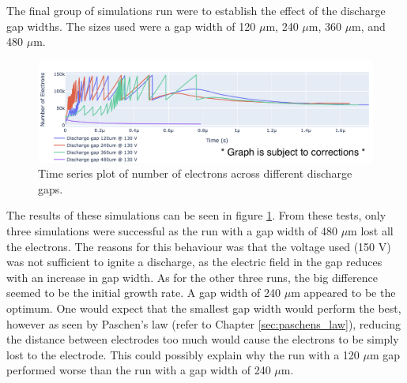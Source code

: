 The final group of simulations run were to establish the effect of the discharge gap widths. The sizes used were a gap width of 120 $\mu$m, 240 $\mu$m, 360 $\mu$m, and 480 $\mu$m. 

\begin{figure}[h!]
	\centering
	\includegraphics[width=\linewidth]{chapter_4/figures/num_elec_gap.png}
	\caption{Time series plot of number of electrons across different discharge gaps.}
	\label{fig:num_elec_gap}
\end{figure}

The results of these simulations can be seen in figure \ref{fig:num_elec_gap}. From these tests, only three simulations were successful as the run with a gap width of 480 $\mu$m lost all the electrons. The reasons for this behaviour was that the voltage used (150 V) was not sufficient to ignite a discharge, as the electric field in the gap reduces with an increase in gap width. As for the other three runs, the big difference seemed to be the initial growth rate. A gap width of 240 $\mu$m appeared to be the optimum. One would expect that the smallest gap width would perform the best, however as seen by Paschen's law (refer to Chapter \ref{sec:paschens_law}), reducing the distance between electrodes too much would cause the electrons to be simply lost to the electrode. This could possibly explain why the run with a 120 $\mu$m gap performed worse than the run with a gap width of 240 $\mu$m.

